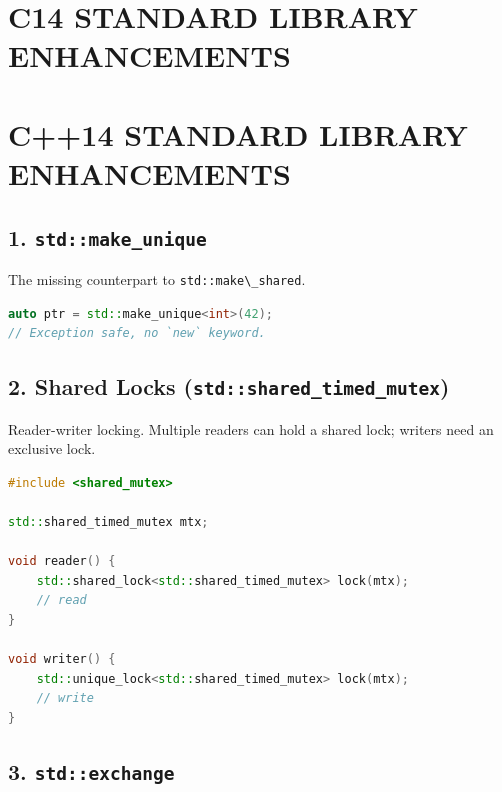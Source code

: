\hypertarget{c14-standard-library-enhancements}{%
\chapter{C14 STANDARD LIBRARY
ENHANCEMENTS}\label{c14-standard-library-enhancements}}

\hypertarget{c14-standard-library-enhancements-1}{%
\chapter{C++14 STANDARD LIBRARY
ENHANCEMENTS}\label{c14-standard-library-enhancements-1}}

\hypertarget{stdmake_unique}{%
\section{\texorpdfstring{1.
\texttt{std::make\_unique}}{1. std::make\_unique}}\label{stdmake_unique}}

The missing counterpart to \passthrough{\lstinline!std::make\_shared!}.

\begin{lstlisting}[language={C++}]
auto ptr = std::make_unique<int>(42);
// Exception safe, no `new` keyword.
\end{lstlisting}

\hypertarget{shared-locks-stdshared_timed_mutex}{%
\section{\texorpdfstring{2. Shared Locks
(\texttt{std::shared\_timed\_mutex})}{2. Shared Locks (std::shared\_timed\_mutex)}}\label{shared-locks-stdshared_timed_mutex}}

Reader-writer locking. Multiple readers can hold a shared lock; writers
need an exclusive lock.

\begin{lstlisting}[language={C++}]
#include <shared_mutex>

std::shared_timed_mutex mtx;

void reader() {
    std::shared_lock<std::shared_timed_mutex> lock(mtx);
    // read
}

void writer() {
    std::unique_lock<std::shared_timed_mutex> lock(mtx);
    // write
}
\end{lstlisting}

\hypertarget{stdexchange}{%
\section{\texorpdfstring{3.
\texttt{std::exchange}}{3. std::exchange}}\label{stdexchange}}

